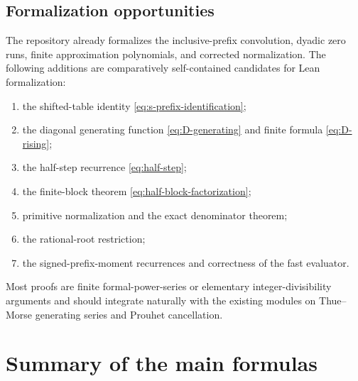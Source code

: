 \documentclass[11pt,oneside]{article}
\theoremstyle{definition}
\theoremstyle{remark}
\begin{document}
\subsection{Formalization opportunities}

The repository already formalizes the inclusive-prefix convolution, dyadic
zero runs, finite approximation polynomials, and corrected normalization.
The following additions are comparatively self-contained candidates for Lean
formalization:
\begin{enumerate}
 \item the shifted-table identity \eqref{eq:s-prefix-identification};
 \item the diagonal generating function \eqref{eq:D-generating} and finite
       formula \eqref{eq:D-rising};
 \item the half-step recurrence \eqref{eq:half-step};
 \item the finite-block theorem \eqref{eq:half-block-factorization};
 \item primitive normalization and the exact denominator theorem;
 \item the rational-root restriction;
 \item the signed-prefix-moment recurrences and correctness of the fast
       evaluator.
\end{enumerate}
Most proofs are finite formal-power-series or elementary integer-divisibility
arguments and should integrate naturally with the existing modules on
Thue--Morse generating series and Prouhet cancellation.

\section{Summary of the main formulas}
\label{sec:summary}
\end{document}
